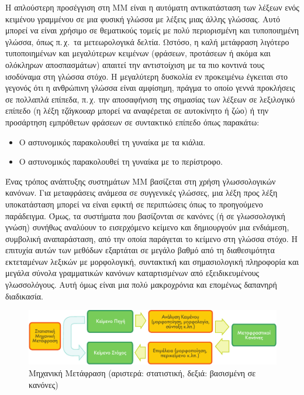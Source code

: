 \documentclass[]{../../metanetpaper}
\begin{document}
\begin{multicols}{2}

Η απλούστερη προσέγγιση στη ΜΜ είναι η αυτόματη αντικατάσταση των λέξεων ενός κειμένου γραμμένου σε μια φυσική γλώσσα με λέξεις μιας άλλης γλώσσας. Αυτό μπορεί να είναι χρήσιμο σε θεματικούς τομείς με πολύ περιορισμένη και τυποποιημένη γλώσσα, όπως π.\,χ.~τα μετεωρολογικά δελτία. Ωστόσο, η καλή μετάφραση λιγότερο τυποποιημένων και μεγαλύτερων κειμένων (φράσεων, προτάσεων ή ακόμα και ολόκληρων αποσπασμάτων) απαιτεί την αντιστοίχιση με τα πιο κοντινά τους ισοδύναμα στη γλώσσα στόχο. Η μεγαλύτερη δυσκολία εν προκειμένω έγκειται στο γεγονός ότι η ανθρώπινη γλώσσα είναι αμφίσημη, πράγμα το οποίο γεννά προκλήσεις σε πολλαπλά επίπεδα, π.\,χ. την αποσαφήνιση της σημασίας των λέξεων σε λεξιλογικό επίπεδο (η λέξη \textit{τζάγκουαρ} μπορεί να αναφέρεται σε αυτοκίνητο ή ζώο) ή την προσάρτηση εμπρόθετων φράσεων σε συντακτικό επίπεδο όπως παρακάτω:

\begin{itemize}
\item Ο αστυνομικός παρακολουθεί τη γυναίκα με τα κιάλια.
\item Ο αστυνομικός παρακολουθεί τη γυναίκα με το περίστροφο.
\end{itemize}

Ένας τρόπος ανάπτυξης συστημάτων ΜΜ βασίζεται στη χρήση  γλωσσολογικών κανόνων. Για μεταφράσεις ανάμεσα σε συγγενικές γλώσσες, μια λέξη προς λέξη υποκατάσταση μπορεί να είναι εφικτή σε περιπτώσεις όπως το προηγούμενο παράδειγμα. Όμως, τα συστήματα που βασίζονται σε κανόνες (ή σε γλωσσολογική γνώση) συνήθως αναλύουν το εισερχόμενο κείμενο και δημιουργούν μια ενδιάμεση, συμβολική αναπαράσταση, από την οποία παράγεται το κείμενο στη γλώσσα στόχο. Η επιτυχία αυτών των μεθόδων εξαρτάται σε μεγάλο βαθμό από τη διαθεσιμότητα εκτεταμένων λεξικών με μορφολογική, συντακτική και σημασιολογική πληροφορία και μεγάλα σύνολα γραμματικών κανόνων καταρτισμένων από εξειδικευμένους γλωσσολόγους. Αυτή όμως είναι μια πολύ μακροχρόνια και επομένως δαπανηρή διαδικασία.

\begin{figure}[htb]
  \center
  \includegraphics[width=\textwidth]{../_media/greek/machine_translation}
  \caption{Μηχανική Μετάφραση (αριστερά: στατιστική, δεξιά: βασισμένη σε κανόνες)}
  \label{fig:mtarch_de}
\end{figure}


\end{multicols}
\end{document}
